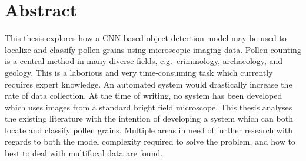 \chapter*{Abstract}
This thesis explores how a CNN based object detection model may be used to localize and classify pollen grains using microscopic imaging data.
Pollen counting is a central method in many diverse fields, e.g.\ criminology, archaeology, and geology.
This is a laborious and very time-consuming task which currently requires expert knowledge.
An automated system would drastically increase the rate of data collection.
At the time of writing, no system has been developed which uses images from a standard bright field microscope.
This thesis analyses the existing literature with the intention of developing a system which can both locate and classify pollen grains.
Multiple areas in need of further research with regards to both the model complexity required to solve the problem, and how to best to deal with multifocal data are found.


